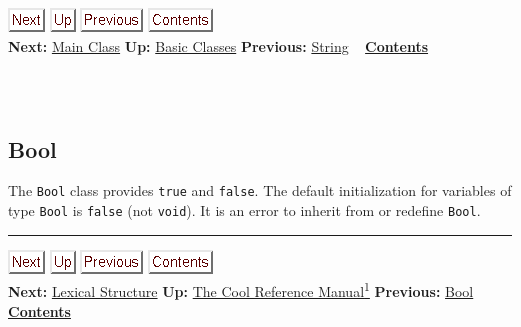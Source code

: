 \documentclass[]{article}
\begin{document}
\href{node32.html}{\includegraphics{next.png}}
\href{node26.html}{\includegraphics{up.png}}
\href{node30.html}{\includegraphics{prev.png}}
\href{node1.html}{\includegraphics{contents.png}} \\ \textbf{Next:}
\href{node32.html}{Main Class} \textbf{Up:} \href{node26.html}{Basic
Classes} \textbf{Previous:} \href{node30.html}{String} ~
\textbf{\href{node1.html}{Contents}} \\ \\

\subsection{\\ Bool}

The \texttt{Bool} class provides \texttt{true} and \texttt{false}. The
default initialization for variables of type \texttt{Bool} is
\texttt{false} (not \texttt{void}). It is an error to inherit from or
redefine \texttt{Bool}.

\begin{center}\rule{3in}{0.4pt}\end{center}

\href{node33.html}{\includegraphics{next.png}}
\href{cool-manual.html}{\includegraphics{up.png}}
\href{node31.html}{\includegraphics{prev.png}}
\href{node1.html}{\includegraphics{contents.png}} \\ \textbf{Next:}
\href{node33.html}{Lexical Structure} \textbf{Up:}
\href{cool-manual.html}{The Cool Reference Manual\textsuperscript{1}}
\textbf{Previous:} \href{node31.html}{Bool} ~
\textbf{\href{node1.html}{Contents}} \\ \\
\end{document}
